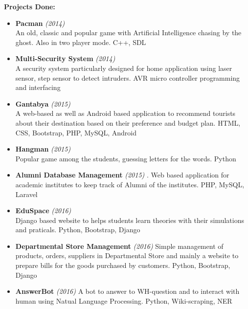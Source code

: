\documentclass[a4paper, 12pt]{article}
\begin{document}
\vspace{8mm}

{\Large \textbf{Projects Done:} \\
}
\vspace{-5mm}
\begin{itemize}

	\item \textbf{Pacman } \emph{(2014)} \\
		\small An old, classic and popular game with Artificial Intelligence
		chasing by the ghost. Also in two player mode. C++, SDL
	\item \textbf{Multi-Security System} \emph{(2014)} \\
		\small A security system particularly designed for home application
		using laser sensor, step sensor to detect intruders. AVR 
		micro controller programming and interfacing
	\item \textbf{Gantabya} \emph{(2015)} \\
		\small A web-based as well as Android based application to recommend
		tourists about their destination based on their preference and budget
		plan. HTML, CSS, Bootstrap, PHP, MySQL, Android
	\item \textbf{Hangman} \emph{(2015)} \\
		\small Popular game among the students, guessing letters for the 
		words. Python
	\item \textbf{Alumni Database Management} \emph{(2015)}
		\small. Web based application for academic institutes to keep 
		track of Alumni of the institutes. PHP, MySQL, Laravel
	\item \textbf{EduSpace} \emph{(2016)} \\
		\small Django based website to helps students learn theories with
		their simulations and praticals. Python, Bootstrap, Django
	\item \textbf{Departmental Store Management} \emph{(2016)}
		\small Simple management of products, orders, suppliers in
		Departmental Store and mainly a website to prepare bills for 
		the goods purchased by customers. Python, Bootstrap, Django
	\item \textbf{AnswerBot} \emph{(2016)}
		\small A bot to answer to WH-question and to interact with human
		using Natual Language Processing. Python, Wiki-scraping, NER
\end{itemize}
\end{document}
